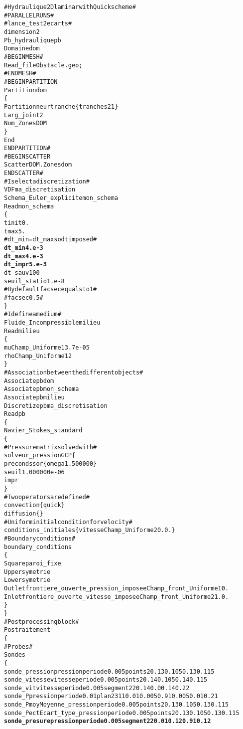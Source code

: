 \begin{alltt}
# Hydraulique 2D laminar with Quick scheme #
# PARALLEL RUNS # 
# lance_test 2 ecarts # 
dimension 2 
Pb_hydraulique pb 
Domaine dom 
# BEGIN MESH # 
Read_file Obstacle.geo ; 
# END MESH # 
# BEGIN PARTITION 
Partition dom 
\{ 
    Partitionneur tranche \{ tranches 2 1 \} 
    Larg_joint 2 
    Nom_Zones DOM 
\} 
End 
END PARTITION # 
# BEGIN SCATTER 
Scatter DOM.Zones dom 
END SCATTER # 
# I select a discretization # 
VDF ma_discretisation 
Schema_Euler_explicite mon_schema 
Read mon_schema 
\{ 
    tinit 0. 
    tmax 5. 
    # dt_min=dt_max so dt imposed # 
    {\bf{dt_min 4.e-3}}
    {\bf{dt_max 4.e-3}}
    {\bf{dt_impr 5.e-3}}
    dt_sauv 100 
    seuil_statio 1.e-8 
    # By default facsec equals to 1 # 
    # facsec 0.5 # 
\} 
# I define a medium # 
Fluide_Incompressible milieu 
Read milieu 
\{ 
    mu Champ_Uniforme 1 3.7e-05 
    rho Champ_Uniforme 1 2 
\} 
# Association between the different objects # 
Associate pb dom 
Associate pb mon_schema 
Associate pb milieu 
Discretize pb ma_discretisation 
Read pb 
\{ 
    Navier_Stokes_standard 
    \{ 
        # Pressure matrix solved with # 
            solveur_pression GCP \{  
            precond ssor \{ omega 1.500000 \}  
            seuil 1.000000e-06  
            impr  
        \} 
        # Two operators are defined # 
        convection \{ quick \} 
        diffusion \{ \} 
        # Uniform initial condition for velocity # 
        conditions_initiales \{ vitesse Champ_Uniforme 2 0. 0. \}
        # Boundary conditions # 
        boundary_conditions 
        \{ 
            Square      paroi_fixe 
            Upper       symetrie 
            Lower       symetrie 
            Outlet      frontiere_ouverte_pression_imposee Champ_front_Uniforme 1 0. 
            Inlet       frontiere_ouverte_vitesse_imposee Champ_front_Uniforme 2 1. 0. 
        \} 
    \} 
    # Post processing block # 
    Postraitement 
    \{ 
        # Probes # 
        Sondes 
        \{ 
            sonde_pression  pression     periode 0.005   points 2 0.13 0.105 0.13 0.115 
            sonde_vitesse   vitesse      periode 0.005   points 2 0.14 0.105    0.14 0.115 
            sonde_vit       vitesse      periode 0.005   segment 22 0.14 0.0 0.14 0.22 
            sonde_P         pression     periode 0.01    plan 23 11 0.01 0.005 0.91 0.005 0.01 0.21 
            sonde_Pmoy      Moyenne_pression    periode 0.005   points 2 0.13 0.105 0.13 0.115 
            sonde_Pect      Ecart_type_pression periode 0.005   points 2 0.13 0.105 0.13 0.115 
            {\bf{sonde_presure   pression  periode 0.005   segment 22 0.01 0.12 0.91 0.12}}

\end{alltt}
